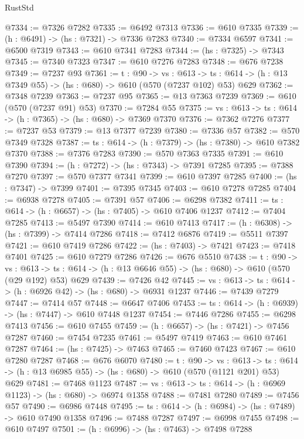 \begin{lexlean}{RustStd}
\begin{coremodule}
@7334 := @7326 @7282
@7335 := @6492 @7313
@7336 := @610 @7335
@7339 := (h : @6491) -> (hs : @7321) -> @7336 @7283
@7340 := @7334 @6597
@7341 := @6500 @7319
@7343 := @610 @7341 @7283
@7344 := (hs : @7325) -> @7343
@7345 := @7340 @7323
@7347 := @610 @7276 @7283
@7348 := @676 @7238
@7349 := @7237 @93
@7361 := {t : @90} ->
  {vs : @613} ->
  {ts : @614} -> (h : @13 @7349 @55) -> (hs : @680) -> @610 (@570 (@7237 @102) @53) @629
@7362 := @7348 @7239
@7363 := @7237 @95
@7365 := @13 @7363 @7239
@7369 := @610 (@570 (@7237 @91) @53)
@7370 := @7284 @55
@7375 := {vs : @613} -> {ts : @614} -> (h : @7365) -> (hs : @680) -> @7369 @7370
@7376 := @7362 @7276
@7377 := @7237 @53
@7379 := @13 @7377 @7239
@7380 := @7336 @57
@7382 := @570 @7349 @7328
@7387 := {ts : @614} -> (h : @7379) -> (hs : @7380) -> @610 @7382 @7370
@7388 := @7376 @7283
@7390 := @570 @7363 @7335
@7391 := @610 @7390
@7394 := (h : @7272) -> (hs : @7343) -> @7391 @7285
@7395 := @7388 @7270
@7397 := @570 @7377 @7341
@7399 := @610 @7397 @7285
@7400 := (hs : @7347) -> @7399
@7401 := @7395 @7345
@7403 := @610 @7278 @7285
@7404 := @6938 @7278
@7405 := @7391 @57
@7406 := @6298 @7382
@7411 := {ts : @614} -> (h : @6657) -> (hs : @7405) -> @610 @7406 @1237
@7412 := @7404 @7285
@7413 := @5497 @7390
@7414 := @610 @7413
@7417 := (h : @6308) -> (hs : @7399) -> @7414 @7286
@7418 := @7412 @6876
@7419 := @5511 @7397
@7421 := @610 @7419 @7286
@7422 := (hs : @7403) -> @7421
@7423 := @7418 @7401
@7425 := @610 @7279 @7286
@7426 := @676 @5510
@7438 := {t : @90} ->
  {vs : @613} ->
  {ts : @614} -> (h : @13 @6646 @55) -> (hs : @680) -> @610 (@570 (@29 @192) @53) @629
@7439 := @7426 @42
@7445 := {vs : @613} -> {ts : @614} -> (h : @6926 @42) -> (hs : @680) -> @6931 @1237
@7446 := @7439 @7279
@7447 := @7414 @57
@7448 := @6647 @7406
@7453 := {ts : @614} -> (h : @6939) -> (hs : @7447) -> @610 @7448 @1237
@7454 := @7446 @7286
@7455 := @6298 @7413
@7456 := @610 @7455
@7459 := (h : @6657) -> (hs : @7421) -> @7456 @7287
@7460 := @7454 @7235
@7461 := @5497 @7419
@7463 := @610 @7461 @7287
@7464 := (hs : @7425) -> @7463
@7465 := @7460 @7423
@7467 := @610 @7280 @7287
@7468 := @676 @6070
@7480 := {t : @90} ->
  {vs : @613} ->
  {ts : @614} -> (h : @13 @6985 @55) -> (hs : @680) -> @610 (@570 (@1121 @201) @53) @629
@7481 := @7468 @1123
@7487 := {vs : @613} -> {ts : @614} -> (h : @6969 @1123) -> (hs : @680) -> @6974 @1358
@7488 := @7481 @7280
@7489 := @7456 @57
@7490 := @6986 @7448
@7495 := {ts : @614} -> (h : @6984) -> (hs : @7489) -> @610 @7490 @1358
@7496 := @7488 @7287
@7497 := @6998 @7455
@7498 := @610 @7497
@7501 := (h : @6996) -> (hs : @7463) -> @7498 @7288

\end{coremodule}
\end{lexlean}
